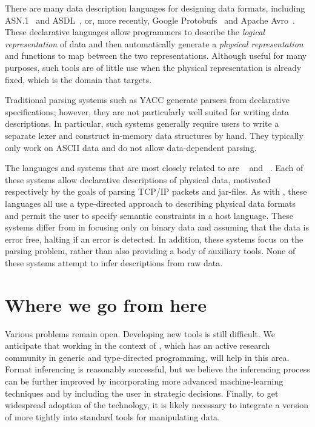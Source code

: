 \documentclass{sig-alternate}
\begin{document}
There are many data description languages for designing data formats,
including ASN.1~\cite{asn} and ASDL~\cite{ASDL}, or, more recently,
Google Protobufs~\cite{protobufs} and Apache Avro~\cite{avro}.  These declarative
languages allow programmers to describe the \textit{logical representation} of
data and then automatically generate a \textit{physical
  representation} and functions to map between the two representations.
Although useful for many purposes, such tools are of little use when
the physical representation is already fixed, which is the domain that
\pads{} targets.

Traditional parsing systems such as \textsc{YACC} generate parsers from
declarative specifications; however, they are not particularly well
suited for writing data descriptions.  In particular, such systems
generally require users to write a separate lexer and construct
in-memory data structures by hand.  They typically only work on ASCII
data and do not allow data-dependent parsing.

The languages and systems that are most closely related to \pads{} are
\packettypes{}~\cite{sigcomm00} and \datascript{}~\cite{gpce02}.  
Each of these systems allow declarative
descriptions of physical data, motivated respectively by the goals of
parsing \textsc{TCP/IP} packets and \java{} jar-files.  As
with \pads{}, these languages all use a type-directed approach to
describing physical data formats and permit the user to specify
semantic constraints in a host language.  These systems differ from
\pads{} in focusing only on binary data and assuming that the data is
error free, halting if an error is detected.  In addition, these
systems focus on the parsing problem, rather than also providing a
body of auxiliary tools.  None of these systems attempt to infer
descriptions from raw data. 



\section{Where we go from here}
\label{sec:conclusion}
Various problems remain open.  
Developing new tools is still difficult.  We anticipate that working
in the context of \haskell{}, which has an active research community
in generic and type-directed programming, will help in this area.  
Format inferencing is reasonably successful, but we believe the
inferencing process can be further improved by incorporating more
advanced machine-learning techniques and by including the user in
strategic decisions.  Finally, to get widespread adoption of the
technology, it is likely necessary to integrate a version of \pads{}
more tightly into standard tools for manipulating data. 
\end{document}

